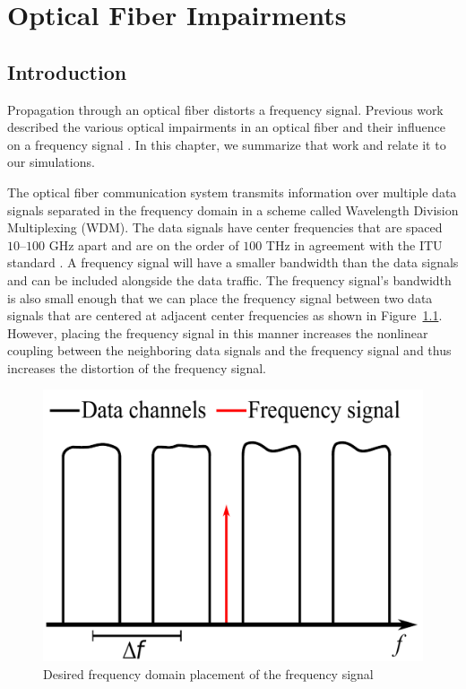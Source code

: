 
\chapter{Optical Fiber Impairments}
\label{chap:fiber_impairments}


\section{Introduction}

Propagation through an optical fiber distorts a frequency signal. Previous work described the various optical impairments in an optical fiber and their influence on a frequency signal \cite{menyukIFCS2015}. In this chapter, we summarize that work and relate it to our simulations.

The optical fiber communication system transmits information over multiple data signals separated in the frequency domain in a scheme called Wavelength Division Multiplexing (WDM). The data signals have center frequencies that are spaced $10$--$100$ GHz apart and are on the order of $100$ THz in agreement with the ITU standard \cite{ITU-T2012}. A frequency signal will have a smaller bandwidth than the data signals and can be included alongside the data traffic. The frequency signal's bandwidth is also small enough that we can place the frequency signal between two data signals that are centered at adjacent center frequencies as shown in Figure~\ref{fig:system}. However, placing the frequency signal in this manner increases the nonlinear coupling between the neighboring data signals and the frequency signal and thus increases the distortion of the frequency signal.

\begin{figure}
	\centering
	\includegraphics[scale=0.6]{img/system.pdf}
	\caption{Desired frequency domain placement of the frequency signal}	\label{fig:system}
\end{figure}

